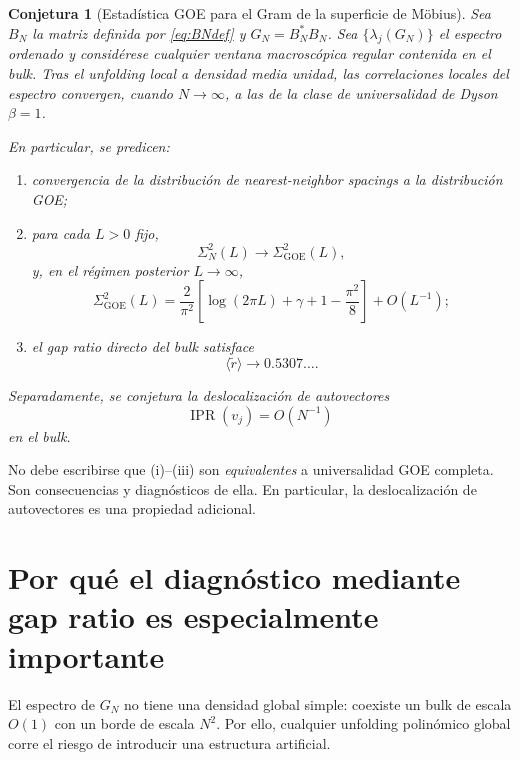 \documentclass[11pt,a4paper]{article}
\newtheorem{conjecture}{Conjetura}
\newcommand{\IPR}{\operatorname{IPR}}
\newcommand{\GOE}{\mathrm{GOE}}
\begin{document}
\begin{conjecture}[Estadística GOE para el Gram de la superficie de Möbius]
Sea $B_N$ la matriz definida por \eqref{eq:BNdef} y $G_N=B_N^*B_N$. Sea $\{\lambda_j(G_N)\}$ el espectro ordenado y considérese cualquier ventana macroscópica regular contenida en el bulk. Tras el unfolding local a densidad media unidad, las correlaciones locales del espectro convergen, cuando $N\to\infty$, a las de la clase de universalidad de Dyson $\beta=1$.

En particular, se predicen:
\begin{enumerate}[label=(\roman*)]
\item convergencia de la distribución de nearest-neighbor spacings a la distribución GOE;
\item para cada $L>0$ fijo,
\begin{equation}
\Sigma_N^2(L)\to\Sigma_{\GOE}^2(L),
\end{equation}
y, en el régimen posterior $L\to\infty$,
\begin{equation}
\Sigma_{\GOE}^2(L)
=
\frac{2}{\pi^2}
\left[
\log(2\pi L)+\gamma+1-\frac{\pi^2}{8}
\right]+O(L^{-1});
\end{equation}
\item el gap ratio directo del bulk satisface
\begin{equation}
\langle\widetilde r\rangle\to0.5307\ldots.
\end{equation}
\end{enumerate}
Separadamente, se conjetura la deslocalización de autovectores
\begin{equation}
\IPR(v_j)=O(N^{-1})
\end{equation}
en el bulk.
\end{conjecture}

No debe escribirse que (i)--(iii) son \emph{equivalentes} a universalidad GOE completa. Son consecuencias y diagnósticos de ella. En particular, la deslocalización de autovectores es una propiedad adicional.

\section{Por qué el diagnóstico mediante gap ratio es especialmente importante}

El espectro de $G_N$ no tiene una densidad global simple: coexiste un bulk de escala $O(1)$ con un borde de escala $N^2$. Por ello, cualquier unfolding polinómico global corre el riesgo de introducir una estructura artificial.
\end{document}
